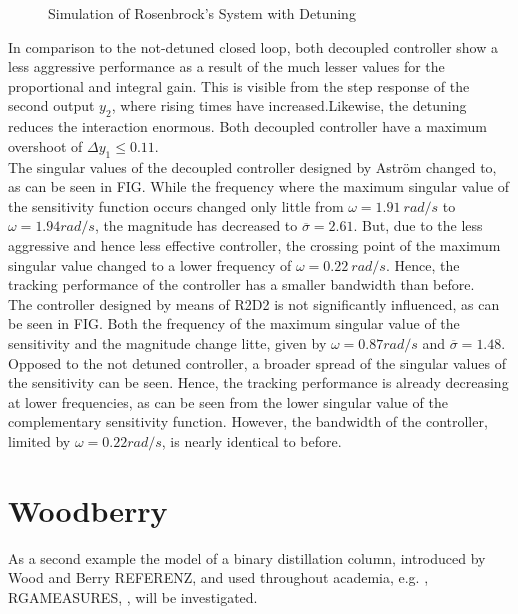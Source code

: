 \begin{figure}[H]\centering


\caption{Simulation of Rosenbrock's System with Detuning}
\label{c:fotd:s:rosenbrock:f:SimDetuned}
\end{figure}

In comparison to the not-detuned closed loop, both decoupled controller show a less aggressive performance as a result of the much lesser values for the proportional and integral gain. This is visible from the step response of the second output $y_2$, where rising times have increased.Likewise, the detuning reduces the interaction enormous. Both decoupled controller have a maximum overshoot of $\Delta y_{1} \leq 0.11$.\\

The singular values of the decoupled controller designed by Astr\"om changed to, as can be seen in FIG. While the frequency where the maximum singular value of the sensitivity function occurs changed only little from $\omega = 1.91~rad/s$ to $\omega = 1.94 rad/s$, the magnitude has decreased to $\overline{\sigma} = 2.61$. But, due to the less aggressive and hence less effective controller, the crossing point of the maximum singular value changed to a lower frequency  of $\omega = 0.22~rad/s$. Hence, the tracking performance of the controller has a smaller bandwidth than before.\\

The controller designed by means of R2D2 is not significantly influenced, as can be seen in FIG. Both the frequency of the maximum singular value of the sensitivity and the magnitude change litte, given by $\omega = 0.87 rad/s$ and $\overline{\sigma} = 1.48$. Opposed to the not detuned controller, a broader spread of the singular values of the sensitivity can be seen. Hence, the tracking performance is already decreasing at lower frequencies, as can be seen from the lower singular value of the complementary sensitivity function. However, the bandwidth of the controller, limited by $\omega = 0.22 rad/s$, is nearly identical to before.\\


\section{Woodberry}%
\label{c:fotd:s:woodberry}

As a second example the model of a binary distillation column, introduced by Wood and Berry REFERENZ, and used throughout academia, e.g. \cite{Astrom2001a}, RGAMEASURES, \cite{Skogestad2005}, will be investigated.\\

